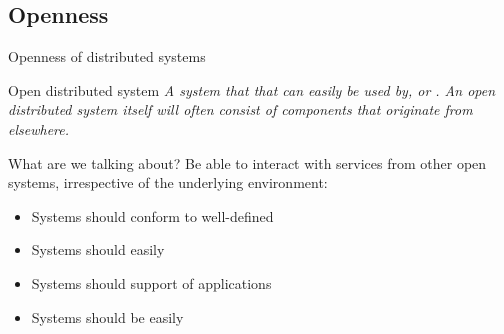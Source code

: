 \subsection{Openness}
\begin{slide}{Openness of distributed systems}
  \begin{block}{Open distributed system}
    \itshape A system that  that can easily be used by, or . An open distributed system itself will often consist of components that originate from
    elsewhere.
  \end{block}

  \begin{block}{What are we talking about?}
    Be able to interact with services from other open systems, irrespective of the underlying environment:
    \begin{itemize}\tightlist
    \item Systems should conform to well-defined 
    \item Systems should easily 
    \item Systems should support  of applications
    \item Systems should be easily 
    \end{itemize}
  \end{block}
\end{slide}
